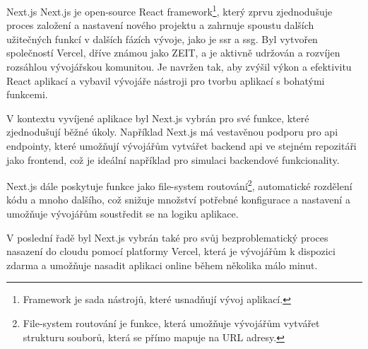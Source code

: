 \begin{subsection}{Next.js}
    \label{subsec:implementace-technologie-nextjs}
    Next.js je open-source React framework\footnote{Framework je sada nástrojů, které usnadňují vývoj aplikací.}, který zprvu zjednodušuje proces založení a nastavení nového projektu a zahrnuje spoustu dalších užitečných funkcí v dalších fázích vývoje, jako je \ac{ssr} a \ac{ssg}.
    Byl vytvořen společností Vercel, dříve známou jako ZEIT, a je aktivně udržován a rozvíjen rozsáhlou vývojářskou komunitou.
    Je navržen tak, aby zvýšil výkon a efektivitu React aplikací a vybavil vývojáře nástroji pro tvorbu aplikací s bohatými funkcemi\cite{n_nextjs_org_docs}.

    V kontextu vyvíjené aplikace byl Next.js vybrán pro své funkce, které zjednodušují běžné úkoly.
    Například Next.js má vestavěnou podporu pro \acs{api} endpointy, které umožňují vývojářům vytvářet backend \acs{api} ve stejném repozitáři jako frontend, což je ideální například pro simulaci backendové funkcionality\cite{n_nextjs_org_docs}.

    Next.js dále poskytuje funkce jako file-system routování\footnote{File-system routování je funkce, která umožňuje vývojářům vytvářet strukturu souborů, která se přímo mapuje na URL adresy.}, automatické rozdělení kódu a mnoho dalšího, což snižuje množství potřebné konfigurace a nastavení a umožňuje vývojářům soustředit se na logiku aplikace\cite{n_nextjs_org_docs}.

    V poslední řadě byl Next.js vybrán také pro svůj bezproblematický proces nasazení do cloudu pomocí platformy Vercel, která je vývojářům k dispozici zdarma a umožňuje nasadit aplikaci online během několika málo minut\cite{n_nextjs_org_docs}.
\end{subsection}

